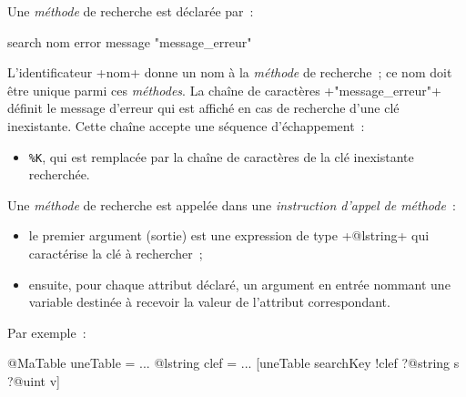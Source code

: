 Une \emph{méthode} de recherche est déclarée par~:


\begin{galgas3}
search nom error message "message_erreur"
\end{galgas3}

\begin{galgas4}
\end{galgas4}

L'identificateur \ggst+nom+ donne un nom à la \emph{méthode} de recherche~; ce nom doit être unique parmi ces \emph{méthodes}. La chaîne de caractères \ggst+"message_erreur"+ définit le message d'erreur qui est affiché en cas de recherche d'une clé inexistante. Cette chaîne accepte une séquence d'échappement~:
\begin{itemize}
  \item \texttt{\%K}, qui est remplacée par la chaîne de caractères de la clé inexistante recherchée.
\end{itemize}


Une \emph{méthode} de recherche est appelée dans une \emph{instruction d'appel de méthode}~:
\begin{itemize}
  \item le premier argument (sortie) est une expression de type \ggst+@lstring+ qui caractérise la clé à rechercher~;
  \item ensuite, pour chaque attribut déclaré, un argument en entrée nommant une variable destinée à recevoir la valeur de l'attribut correspondant.
\end{itemize}

Par exemple~:
\begin{galgas3}
@MaTable uneTable = {}
...
@lstring clef = ...
[uneTable searchKey !clef ?@string s ?@uint v]
\end{galgas3}


%
%
%
%
%







